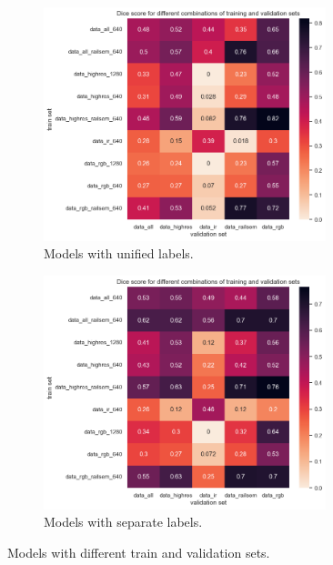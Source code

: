 \documentclass[Master,MDS,english]{BASE/twbook} %
\begin{document}
\begin{figure}[H]
\centering
\begin{subfigure}[t]{.5\textwidth}
  \centering
  \includegraphics[width=0.9\textwidth]{images/yolo/models}
  \caption{Models with unified labels.}
\end{subfigure}%
\begin{subfigure}[t]{.5\textwidth}
  \centering
  \includegraphics[width=0.9\textwidth]{images/yolo/models_new_label}
  \caption{Models with separate labels. }
\end{subfigure}
\caption{Models with different train and validation sets.}
\label{fig:yolo_models1}
\end{figure}
\end{document}
